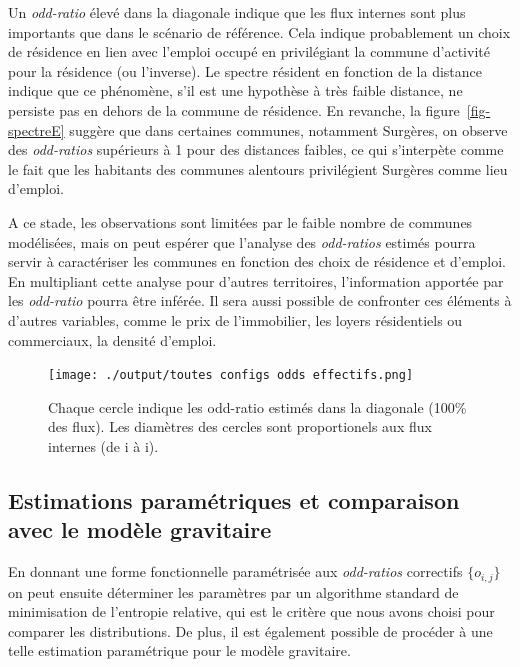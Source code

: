 \documentclass[
  10pt,
  a4paper,
  numbers=noendperiod,
  DIV=9]{scrreprt}
\begin{document}
Un \emph{odd-ratio} élevé dans la diagonale indique que les flux
internes sont plus importants que dans le scénario de référence. Cela
indique probablement un choix de résidence en lien avec l'emploi occupé
en privilégiant la commune d'activité pour la résidence (ou l'inverse).
Le spectre résident en fonction de la distance indique que ce phénomène,
s'il est une hypothèse à très faible distance, ne persiste pas en dehors
de la commune de résidence. En revanche, la figure~\ref{fig-spectreE}
suggère que dans certaines communes, notamment Surgères, on observe des
\emph{odd-ratios} supérieurs à 1 pour des distances faibles, ce qui
s'interpète comme le fait que les habitants des communes alentours
privilégient Surgères comme lieu d'emploi.

A ce stade, les observations sont limitées par le faible nombre de
communes modélisées, mais on peut espérer que l'analyse des
\emph{odd-ratios} estimés pourra servir à caractériser les communes en
fonction des choix de résidence et d'emploi. En multipliant cette
analyse pour d'autres territoires, l'information apportée par les
\emph{odd-ratio} pourra être inférée. Il sera aussi possible de
confronter ces éléments à d'autres variables, comme le prix de
l'immobilier, les loyers résidentiels ou commerciaux, la densité
d'emploi.

\begin{figure}[htb]

{\centering \texttt{[image: ./output/toutes configs odds effectifs.png]}

}

\caption[Odd-ratio dans la diagonale]{\label{fig-carteodd}Chaque cercle
indique les odd-ratio estimés dans la diagonale (100\% des flux). Les
diamètres des cercles sont proportionels aux flux internes (de i à i).}

\end{figure}

\hypertarget{estimations-paramuxe9triques-et-comparaison-avec-le-moduxe8le-gravitaire}{%
\subsection{Estimations paramétriques et comparaison avec le modèle
gravitaire}\label{estimations-paramuxe9triques-et-comparaison-avec-le-moduxe8le-gravitaire}}

En donnant une forme fonctionnelle paramétrisée aux \emph{odd-ratios}
correctifs \(\{o_{i,j}\}\) on peut ensuite déterminer les paramètres par
un algorithme standard de minimisation de l'entropie relative, qui est
le critère que nous avons choisi pour comparer les distributions. De
plus, il est également possible de procéder à une telle estimation
paramétrique pour le modèle gravitaire.
\end{document}
